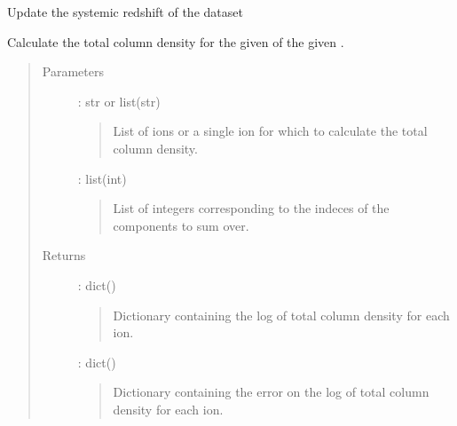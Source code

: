 \documentclass[letterpaper,10pt,english]{sphinxmanual}
\begin{document}
\begin{fulllineitems}
\begin{fulllineitems}
\end{fulllineitems}


\begin{fulllineitems}
\label{\detokenize{api:VoigtFit.DataSet.set_systemic_redshift}}
Update the systemic redshift of the dataset

\end{fulllineitems}


\begin{fulllineitems}
\label{\detokenize{api:VoigtFit.DataSet.sum_components}}
Calculate the total column density for the given 
of the given .
\begin{quote}\begin{description}
\item[{Parameters}] \leavevmode
{} : str or list(str)
\begin{quote}

List of ions or a single ion for which to calculate the total
column density.
\end{quote}

 : list(int)
\begin{quote}

List of integers corresponding to the indeces of the components
to sum over.
\end{quote}

\item[{Returns}] \leavevmode
{} : dict()
\begin{quote}

Dictionary containing the log of total column density for each ion.
\end{quote}

 : dict()
\begin{quote}

Dictionary containing the error on the log of total column density
for each ion.
\end{quote}

\end{description}\end{quote}


\end{fulllineitems}
\end{fulllineitems}
\end{document}

